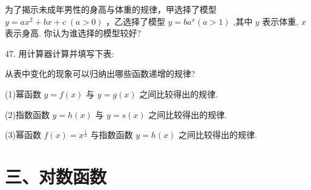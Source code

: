 \documentclass[10pt]{article}
\begin{document}
为了揭示未成年男性的身高与体重的规律，甲选择了模型 \(y = a{x}^{2} + {bx} + c\;\left( {a > 0}\right)\) ，乙选择了模型 \(y = b{a}^{x}\left( {a > 1}\right)\) ,其中 \(y\) 表示体重, \(x\) 表示身高. 你认为谁选择的模型较好?

47. 用计算器计算并填写下表:

\begin{center}
\end{center}

从表中变化的现象可以归纳出哪些函数递增的规律?

(1)幂函数 \(y = f\left( x\right)\) 与 \(y = g\left( x\right)\) 之间比较得出的规律.

(2)指数函数 \(y = h\left( x\right)\) 与 \(y = s\left( x\right)\) 之间比较得出的规律.

(3)幂函数 \(f\left( x\right)  = {x}^{\frac{1}{2}}\) 与指数函数 \(y = h\left( x\right)\) 之间比较得出的规律.

\section*{三、对数函数}
\end{document}
